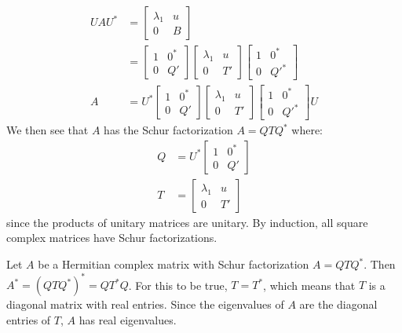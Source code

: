 \documentclass{article}
\begin{document}
\begin{align*}
    UAU^* & = \begin{bmatrix}
        \lambda_1 & u \\ 0 & B
    \end{bmatrix} \\
    & = \begin{bmatrix}
        1 & 0^* \\ 0 & Q'
    \end{bmatrix}\begin{bmatrix}
        \lambda_1 & u \\ 0 & T'
    \end{bmatrix}\begin{bmatrix}
        1 & 0^* \\ 0 & Q'^*
    \end{bmatrix} \\
    A & = U^*\begin{bmatrix}
        1 & 0^* \\ 0 & Q'
    \end{bmatrix}\begin{bmatrix}
        \lambda_1 & u \\ 0 & T'
    \end{bmatrix}\begin{bmatrix}
        1 & 0^* \\ 0 & Q'^*
    \end{bmatrix}U
\end{align*}
We then see that $A$ has the Schur factorization $A = QTQ^*$ where:
\begin{align*}
    Q & = U^*\begin{bmatrix}
        1 & 0^* \\ 0 & Q'
    \end{bmatrix} \\
    T & = \begin{bmatrix}
        \lambda_1 & u \\ 0 & T'
    \end{bmatrix}
\end{align*}
since the products of unitary matrices are unitary. By induction, all square complex matrices have Schur factorizations.

Let $A$ be a Hermitian complex matrix with Schur factorization $A = QTQ^*$. Then $A^* = (QTQ^*)^* = QT^*Q$. For this to be true, $T = T^*$, which means that $T$ is a diagonal matrix with real entries. Since the eigenvalues of $A$ are the diagonal entries of $T$, $A$ has real eigenvalues.
\end{document}
